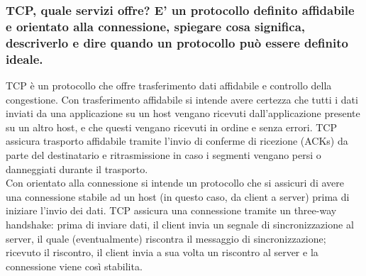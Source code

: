 \documentclass[11pt]{article}
\begin{document}
\subsubsection*{TCP, quale servizi offre? E' un protocollo definito affidabile e orientato alla connessione, spiegare cosa significa, descriverlo e dire quando un protocollo può essere definito ideale.}
TCP è un protocollo che offre trasferimento dati affidabile e controllo della congestione. Con trasferimento affidabile 
si intende avere certezza che tutti i dati inviati da una applicazione su un host vengano ricevuti dall'applicazione presente 
su un altro host, e che questi vengano ricevuti in ordine e senza errori. TCP assicura trasporto affidabile tramite l'invio 
di conferme di ricezione (ACKs) da parte del destinatario e ritrasmissione in caso i segmenti vengano persi o danneggiati
durante il trasporto.\\
Con orientato alla connessione si intende un 
protocollo che si assicuri di avere una connessione stabile ad un host (in questo caso, da client a server) prima di iniziare 
l'invio dei dati. TCP assicura una connessione tramite un three-way handshake: prima di inviare dati, il client invia un 
segnale di sincronizzazione al server, il quale (eventualmente) riscontra il messaggio di sincronizzazione; ricevuto il 
riscontro, il client invia a sua volta un riscontro al server e la connessione viene così stabilita.
\end{document}
